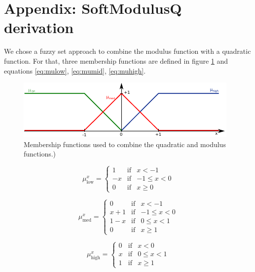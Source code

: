 \documentclass[authoryear]{elsarticle}
\begin{document}
\newpage

\newpage






\section*{Appendix: SoftModulusQ derivation}
We chose a fuzzy set approach to combine the modulus function with a quadratic function. For that, three membership functions are defined in figure \ref{fig:fuzzy} and equations \ref{eq:mulow}, \ref{eq:mumid}, \ref{eq:muhigh}. 
\begin{figure}[h!]
	\centering
	\includegraphics[width=1\linewidth]{figs/fuzzy}
	\caption{Membership functions used to combine the quadratic and modulus functions.)}
	\label{fig:fuzzy}
\end{figure}

\begin{equation}
	\label{eq:mulow}
	\mu^x_{\text{low}}= \left\{ \begin{array}{lcc}
		1 &   \text{if}  & x < -1 \\
		-x & \text{if}  & -1 \leq x < 0 \\
		0 &  \text{if} & x \geq 0 
		\end{array}
		\right.
\end{equation}

\begin{equation}
	\label{eq:mumid}
	\mu^x_{\text{med}}= \left\{ \begin{array}{lcc}
		0 &   \text{if}  & x < -1 \\
		x+1 & \text{if}  & -1 \leq x < 0 \\
		1-x & \text{if}  & 0 \leq x < 1 \\
		0 &  \text{if} & x \geq 1
		\end{array}
		\right.
\end{equation}

\begin{equation}
	\label{eq:muhigh}
	\mu^x_{\text{high}}= \left\{ \begin{array}{lcc}
	0 &   \text{if}  & x < 0 \\
	x & \text{if}  & 0 \leq x < 1 \\
	1 &  \text{if} & x \geq 1 
	\end{array}
	\right.
\end{equation}
\end{document}
